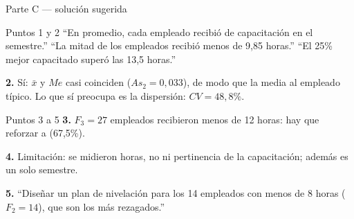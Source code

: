 \documentclass[aspectratio=169,10pt]{beamer}
\begin{document}
\begin{frame}{Parte C — solución sugerida}
  \scriptsize
  \begin{block}{Puntos 1 y 2}
    \scriptsize
    ``En promedio, cada empleado recibió  de capacitación en el
    semestre.'' \quad ``La mitad de los empleados recibió menos de 9,85
    horas.'' \quad ``El 25\% mejor capacitado superó las 13,5 horas.''

    \vspace{0.1cm}
    \textbf{2.} Sí: $\bar{x}$ y $Me$ casi coinciden ($As_2 = 0{,}033$), de modo
    que la media  al empleado típico. Lo que sí
    preocupa es la dispersión: $CV = 48{,}8\%$.
  \end{block}

  \vspace{0.1cm}
  \begin{exampleblock}{Puntos 3 a 5}
    \scriptsize
    \textbf{3.} $F_3 = 27$ empleados recibieron menos de 12 horas: hay que
    reforzar a  (67,5\%).

    \textbf{4.} Limitación: se midieron horas, no  ni
    pertinencia de la capacitación; además es un solo semestre.

    \textbf{5.} ``Diseñar un plan de nivelación para los 14 empleados con menos
    de 8 horas ($F_2 = 14$), que son los más rezagados.''
  \end{exampleblock}
\end{frame}
\end{document}

